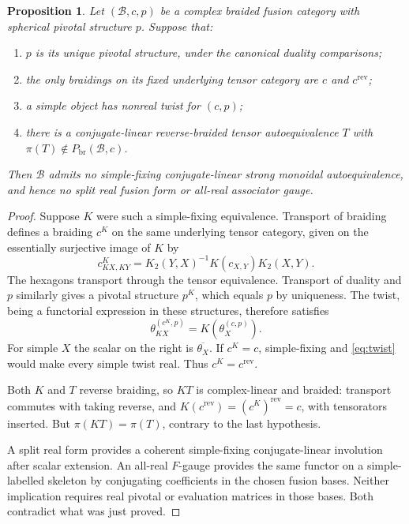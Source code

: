 \documentclass[11pt]{amsart}
\newtheorem{proposition}[theorem]{Proposition}
\theoremstyle{remark}
\newcommand{\B}{\mathcal B}
\newcommand{\rev}{\mathrm{rev}}
\newcommand{\Br}{\mathrm{br}}
\begin{document}
\begin{proposition}\label{prop:criterion}
Let $(\B,c,p)$ be a complex braided fusion category with spherical pivotal
structure $p$. Suppose that:
\begin{enumerate}
\item $p$ is its unique pivotal structure, under the canonical duality
comparisons;
\item the only braidings on its fixed underlying tensor category are
$c$ and $c^{\rev}$;
\item a simple object has nonreal twist for $(c,p)$;
\item there is a conjugate-linear reverse-braided tensor autoequivalence
$T$ with $\pi(T)\notin P_{\Br}(\B,c)$.
\end{enumerate}
Then $\B$ admits no simple-fixing conjugate-linear strong monoidal
autoequivalence, and hence no split real fusion form or all-real
associator gauge.
\end{proposition}

\begin{proof}
Suppose $K$ were such a simple-fixing equivalence. Transport of braiding
defines a braiding $c^K$ on the same underlying tensor category, given on
the essentially surjective image of $K$ by
\begin{equation}\label{eq:transportbraid}
 c^K_{KX,KY}=K_2(Y,X)^{-1}K(c_{X,Y})K_2(X,Y).
\end{equation}
The hexagons transport through the tensor equivalence. Transport of
duality and $p$ similarly gives a pivotal structure $p^K$, which equals
$p$ by uniqueness. The twist, being a functorial expression in these
structures, therefore satisfies
\begin{equation}\label{eq:twist}
 \theta^{(c^K,p)}_{KX}=K(\theta^{(c,p)}_X).
\end{equation}
For simple $X$ the scalar on the right is $\overline{\theta_X}$.
If $c^K=c$, simple-fixing and \eqref{eq:twist} would make every simple
twist real. Thus $c^K=c^{\rev}$.

Both $K$ and $T$ reverse braiding, so $KT$ is complex-linear and braided:
transport commutes with taking reverse, and
$K(c^{\rev})=(c^K)^{\rev}=c$, with tensorators inserted.
But $\pi(KT)=\pi(T)$, contrary to the last hypothesis.

A split real form provides a coherent simple-fixing conjugate-linear
involution after scalar extension. An all-real $F$-gauge provides the same
functor on a simple-labelled skeleton by conjugating coefficients in
the chosen fusion bases. Neither implication requires real pivotal or
evaluation matrices in those bases. Both contradict what was just
proved.
\end{proof}
\end{document}
